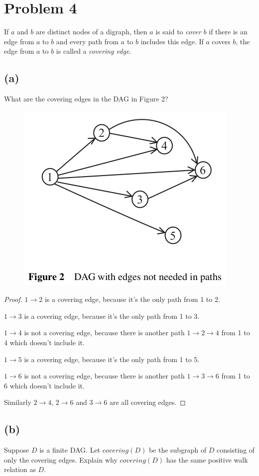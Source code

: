 \documentclass[14pt]{extarticle}
\begin{document}
\section{Problem 4}
If $a$ and $b$ are distinct nodes of a digraph, then $a$ is said to {\it cover} $b$ if there is an edge from $a$ to $b$ and every path from $a$ to $b$ includes this edge. If $a$ covers $b$, the edge from $a$ to $b$ is called a {\it covering edge}.
\subsection{(a)}
What are the covering edges in the DAG in Figure 2?
\begin{figure}[ht!]
\centering
\includegraphics[scale=0.5]{dag.png}
\end{figure}

\begin{proof}
$1 \to 2$ is a covering edge, because it's the only path from 1 to 2.

$1 \to 3$ is a covering edge, because it's the only path from 1 to 3.

$1 \to 4$ is not a covering edge, because there is another path $1 \to 2 \to 4$ from 1 to 4 which doesn't include it.

$1 \to 5$ is a covering edge, because it's the only path from 1 to 5.

$1 \to 6$ is not a covering edge, because there is another path $1 \to 3 \to 6$ from 1 to 6 which doesn't include it.

Similarly $2 \to 4$, $2 \to 6$ and $3 \to 6$ are all covering edges.
\end{proof}

\subsection{(b)}
Suppose $D$ is a finite DAG. Let $covering(D)$ be the subgraph of $D$ consisting of only the covering edges. Explain why $covering(D)$ has the same positive walk relation as $D$.
\end{document}
